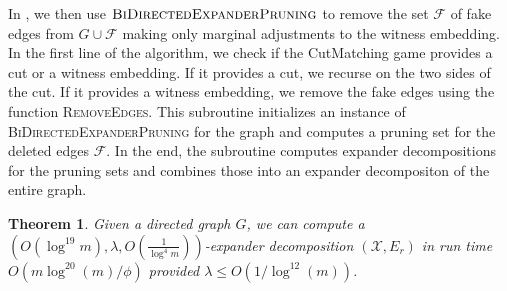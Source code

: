 \documentclass[11pt]{article}
\newtheorem{theorem}{Theorem}[section]
\begin{document}
In , we then use $\textsc{BiDirectedExpanderPruning}$ to remove the set $\mathcal{F}$ of fake edges from $G \cup \mathcal{F}$ making only marginal adjustments to the witness embedding. In the first line of the algorithm, we check if the CutMatching game provides a cut or a witness embedding. If it provides a cut, we recurse on the two sides of the cut. If it provides a witness embedding, we remove the fake edges using the function \textsc{RemoveEdges}. This subroutine initializes an instance of \textsc{BiDirectedExpanderPruning} for the graph and computes a pruning set for the deleted edges $\mathcal{F}$. In the end, the subroutine computes expander decompositions for the pruning sets and combines those into an expander decompositon of the entire graph.

\begin{theorem}\label{thm:StaticExpanderDecomp}
    Given a directed graph $G$, we can compute a $\left(O(\log^{19} m), \lambda, O\left(\frac{1}{\log^4 m}\right)\right)$-expander decomposition $(\mathcal{X}, E_r)$ in run time $O(m \log^{20}(m)/\phi)$ provided $\lambda \leq O(1/\log^{12}(m))$.
\end{theorem}
\end{document}
